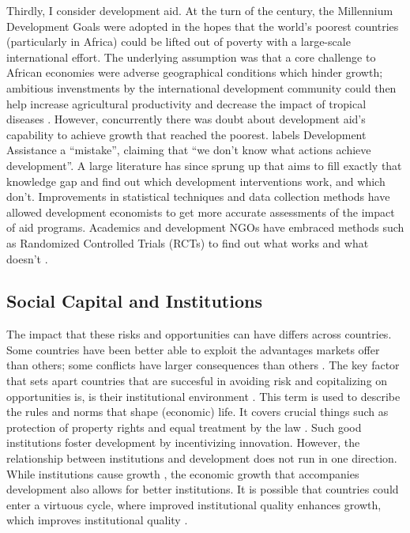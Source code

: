 Thirdly, I consider development aid. At the turn of the century, the Millennium Development Goals were adopted in the hopes that the world's poorest countries (particularly in Africa) could be lifted out of poverty with a large-scale international effort. The underlying assumption was that a core challenge to African economies were adverse geographical conditions which hinder growth; ambitious invenstments by the international development community could then help increase agricultural productivity and decrease the impact of tropical diseases . However, concurrently there was doubt about development aid's capability to achieve growth that reached the poorest. \citet{Easterly2007} labels Development Assistance a ``mistake'', claiming that ``we don't know what actions achieve development''.  A large literature has since sprung up that aims to fill exactly that knowledge gap and find out which development interventions work, and which don't. Improvements in statistical techniques and data collection methods have allowed development economists to get more accurate assessments of the impact of aid programs. Academics and development NGOs have embraced methods such as Randomized Controlled Trials (RCTs) to find out what works and what doesn't .   


\subsection{Social Capital and Institutions}
The impact that these risks and opportunities can have differs across countries. Some countries have been better able to exploit the advantages markets offer than others; some conflicts have larger consequences than others . The key factor that sets apart countries that are succesful in avoiding risk and copitalizing on opportunities is, is their institutional environment \citep{Rodrik2004,Acemoglu2000}. This term is used to describe the rules and norms that shape (economic) life. It covers crucial things such as protection of property rights and equal treatment by the law \citep{Acemoglu2005}. Such good institutions  foster development by incentivizing innovation. However, the relationship between institutions and development does not run in one direction. While institutions cause growth \citep{Acemoglu2000}, the economic growth that accompanies development also allows for better institutions. It is possible that countries could enter a virtuous cycle, where improved institutional quality enhances growth, which improves institutional quality \citep{Voors2011}.

